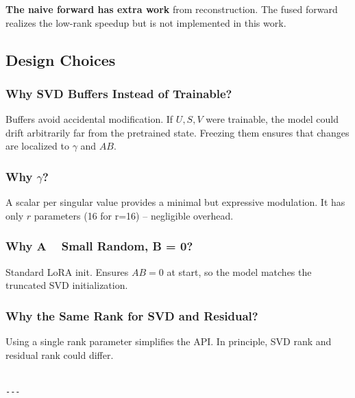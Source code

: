 \textbf{The naive forward has extra work} from reconstruction. The fused forward 
realizes the low-rank speedup but is not implemented in this work.

\subsection{Design Choices}

\subsubsection{Why SVD Buffers Instead of Trainable?}

Buffers avoid accidental modification. If $U, S, V$ were trainable, the model 
could drift arbitrarily far from the pretrained state. Freezing them ensures 
that changes are localized to $\gamma$ and $AB$.

\subsubsection{Why $\gamma$?}

A scalar per singular value provides a minimal but expressive modulation. 
It has only $r$ parameters (16 for r=16) -- negligible overhead.

\subsubsection{Why A ~ Small Random, B = 0?}

Standard LoRA init. Ensures $AB = 0$ at start, so the model matches the 
truncated SVD initialization.

\subsubsection{Why the Same Rank for SVD and Residual?}

Using a single rank parameter simplifies the API. In principle, SVD rank and 
residual rank could differ.
\begin{lstlisting}

---
\end{lstlisting}